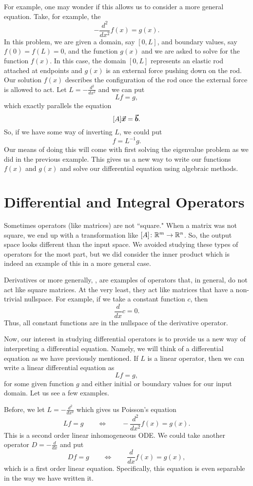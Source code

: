 For example, one may wonder if this allows us to consider a more general equation. Take, for example, the 
\[
-\frac{d^2}{dx^2} f(x) = g(x).
\]
In this problem, we are given a domain, say $[0,L]$, and boundary values, say $f(0)=f(L)=0$, and the function $g(x)$ and we are asked to solve for the function $f(x)$.  In this case, the domain $[0,L]$ represents an elastic rod attached at endpoints and $g(x)$ is an external force pushing down on the rod. Our solution $f(x)$ describes the configuration of the rod once the external force is allowed to act.  Let $L=-\frac{d^2}{dx^2}$ and we can put
\[
Lf=g,
\]
which exactly parallels the equation
\[
[A]\boldsymbol{\boldsymbol{\vec{x}}} = \boldsymbol{\vec{b}}.
\]
So, if we have some way of inverting $L$, we could put
\[
f= L^{-1}g.
\]
Our means of doing this will come with first solving the eigenvalue problem as we did in the previous example. This gives us a new way to write our functions $f(x)$ and $g(x)$ and solve our differential equation using algebraic methods.

\section{Differential and Integral Operators}
Sometimes operators (like matrices) are not ``square." When a matrix was not square, we end up with a transformation like $[A]\colon \mathbb{R}^m \to \mathbb{R}^n$.  So, the output space looks different than the input space.  We avoided studying these types of operators for the most part, but we did consider the inner product which is indeed an example of this in a more general case.  

Derivatives or more generally, , are examples of operators that, in general, do not act like square matrices.  At the very least, they act like matrices that have a non-trivial nullspace.  For example, if we take a constant function $c$, then
\[
\frac{d}{dx}c = 0.
\]
Thus, all constant functions are in the nullspace of the derivative operator.

Now, our interest in studying differential operators is to provide us a new way of interpreting a differential equation. Namely, we will think of a differential equation as we have previously mentioned.  If $L$ is a linear operator, then we can write a linear differential equation as
\[
Lf = g,
\]
for some given function $g$ and either initial or boundary values for our input domain.  Let us see a few examples.  

Before, we let $L=-\frac{d^2}{dx^2}$ which gives us Poisson's equation
\[
Lf = g \qquad \iff \qquad -\frac{d^2}{dx^2}f(x) = g(x).
\]
This is a second order linear inhomogeneous ODE. We could take another operator $D=-\frac{d}{dx}$ and put
\[
Df= g \qquad \iff \qquad \frac{d}{dx} f(x) = g(x),
\]
which is a first order linear equation. Specifically, this equation is even separable in the way we have written it.  

